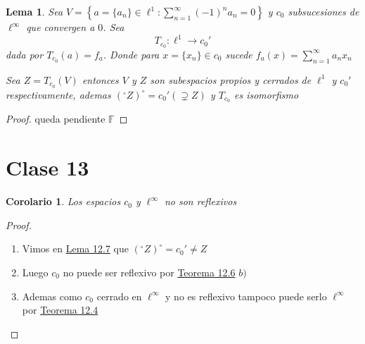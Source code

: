 \documentclass[10pt]{extarticle}
\theoremstyle{break}
\newtheorem{corollary}{Corolario}[theorem]
\newtheorem{lemma}[theorem]{Lema}
\theoremstyle{definition}
\begin{document}
\begin{lemma}\label{12.7}
	Sea $V=\left\{  a=\{ a_{n} \}\in \ell^{1} : \sum^{\infty}_{n=1}(-1)^{n}a_{n}=0 \right\}$ y $c_{0}$ subsucesiones de $\ell^{\infty}$ que convergen a $0$. Sea 
	$$T_{c_{0}}:\ell^{1}\rightarrow c_{0}'$$ dada por $T_{c_{0}}(a)=f_{a}$. 
	Donde para $x=\{ x_{n} \}\in c_{0}$ sucede $f_{a}(x)=\sum^{\infty}_{n=1}a_{n}x_{n}$

	Sea $Z=T_{c_{0}}(V)$ entonces $V$ y $Z$ son subespacios propios y cerrados de $\ell^{1}$ y $c_{0}'$ respectivamente, ademas $(^{\circ}Z)^{\circ}=c_{0}'(\supsetneq Z)$ y $T_{c_{0}}$ es isomorfismo
\end{lemma}
\begin{proof}
queda pendiente $\mathbb{F}$
\end{proof}



\section{Clase 13}

\begin{corollary}
	Los espacios $c_{0}$ y $\ell^{\infty}$ no son reflexivos
\end{corollary}
\begin{proof}
	\begin{enumerate}
		\item Vimos en \hyperref[12.7]{Lema 12.7}  que $ ( ^{\circ}Z  ) ^{\circ} =c_{0}'\neq Z $ 
		\item Luego $ c_{0} $ no puede ser reflexivo por \hyperref[12.6]{Teorema 12.6} $ b) $ 
		\item Ademas como $ c_{0} $ cerrado en $ \ell^{\infty}  $ y no es reflexivo tampoco puede serlo $ \ell^{\infty}  $ por \hyperref[12.4]{Teorema 12.4} 
	\end{enumerate}
\end{proof}
\end{document}
